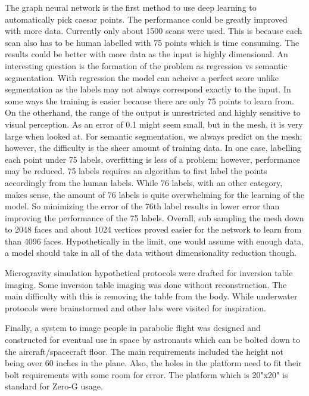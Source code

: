 The graph neural network is the first method to use deep learning to automatically pick caesar points. The performance could be greatly improved with more data. Currently only about 1500 scans were used. This is because each scan also has to be human labelled with 75 points which is time consuming. The results could be better with more data as the input is highly dimensional. An interesting question is the formation of the problem as regression vs semantic segmentation. With regression the model can acheive a perfect score unlike segmentation as the labels may not always correspond exactly to the input. In some ways the training is easier because there are only 75 points to learn from. On the otherhand, the range of the output is unrestricted and highly sensitive to visual perception. As an error of 0.1 might seem small, but in the mesh, it is very large when looked at. For semantic segmentation, we always predict on the mesh; however, the difficulty is the sheer amount of training data. In one case, labelling each point under 75 labels, overfitting is less of a problem; however, performance may be reduced. 75 labels requires an algorithm to first label the points accordingly from the human labels. While 76 labels, with an other category, makes sense, the amount of 76 labels is quite overwhelming for the learning of the model. So minimizing the error of the 76th label results in lower error than improving the performance of the 75 labels. Overall, sub sampling the mesh down to 2048 faces and about 1024 vertices proved easier for the network to learn from than 4096 faces. Hypothetically in the limit, one would assume with enough data, a model should take in all of the data without dimensionality reduction though.

Microgravity simulation hypothetical protocols were drafted for inversion table imaging. Some inversion table imaging was done without reconstruction. The main difficulty with this is removing the table from the body. While underwater protocols were brainstormed and other labs were visited for inspiration.

Finally, a system to image people in parabolic flight was designed and constructed for eventual use in space by astronauts which can be bolted down to the aircraft/spacecraft floor. The main requirements included the height not being over 60 inches in the plane. Also, the holes in the platform need to fit their bolt requirements with some room for error. The platform which is 20"x20" is standard for Zero-G usage.
